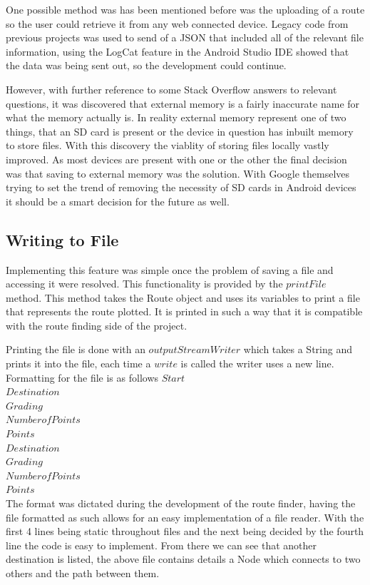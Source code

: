 One possible method was has been mentioned before was the uploading of a route so the user could retrieve it from any web connected device. Legacy code from previous projects was used to send of a JSON that included all of the relevant file information, using the LogCat feature in the Android Studio IDE\cite{as} showed that the data was being sent out, so the development could continue.

However, with further reference to some Stack Overflow answers to relevant questions\cite{check}, it was discovered that external memory is a fairly inaccurate name for what the memory actually is. In reality external memory represent one of two things, that an SD card is present or the device in question has inbuilt memory to store files\cite{storage}. With this discovery the viablity of storing files locally vastly improved. As most devices are present with one or the other the final decision was that saving to external memory was the solution. With Google themselves trying to set the trend of removing the necessity of SD cards in Android devices it should be a smart decision for the future as well. 

\subsection{Writing to File}
Implementing this feature was simple once the problem of saving a file and accessing it were resolved. This functionality is provided by the $printFile$ method. This method takes the Route object and uses its variables to print a file that represents the route plotted. It is printed in such a way that it is compatible with the route finding side of the project. 

Printing the file is done with an $outputStreamWriter$ which takes a String and prints it into the file, each time a $write$ is called the writer uses a new line. Formatting for the file is as follows
$Start$\\
$Destination$\\
$Grading$\\
$Number of Points$\\
$Points$\\
$Destination$\\
$Grading$\\
$Number of Points$\\
$Points$\\
The format was dictated during the development of the route finder, having the file formatted as such allows for an easy implementation of a file reader. With the first 4 lines being static throughout files and the next being decided by the fourth line the code is easy to implement. From there we can see that another destination is listed, the above file contains details a Node which connects to two others and the path between them. 


